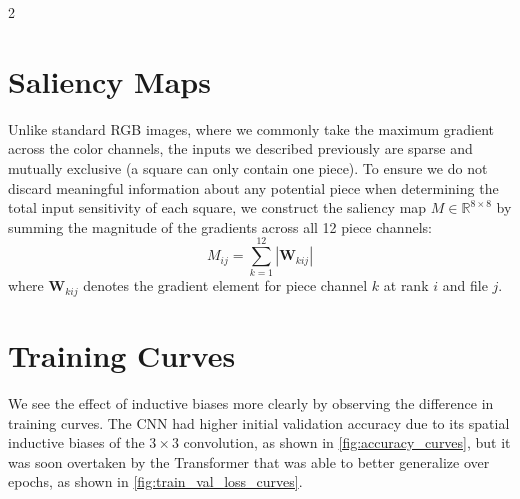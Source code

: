 \documentclass[a4paper,10pt]{article}
\begin{document}
\begin{multicols*}{2}
\section{Saliency Maps}
\label{sec:saliency_maps}
Unlike standard RGB images, where we commonly take the maximum gradient across the color channels, the inputs we described previously are sparse and mutually exclusive (a square can only contain one piece). To ensure we do not discard meaningful information about any potential piece when determining the total input sensitivity of each square, we construct the saliency map $M \in \mathbb{R}^{8 \times 8}$ by summing the magnitude of the gradients across all 12 piece channels:
\[M_{ij} = \sum_{k=1}^{12} | \mathbf{W}_{kij} |\]
where $\mathbf{W}_{kij}$ denotes the gradient element for piece channel $k$ at rank $i$ and file $j$.

\section{Training Curves}
\label{sec:training_curves}
We see the effect of inductive biases more clearly by observing the difference in training curves. The CNN had higher initial validation accuracy due to its spatial inductive biases of the $3 \times 3$ convolution, as shown in \autoref{fig:accuracy_curves}, but it was soon overtaken by the Transformer that was able to better generalize over epochs, as shown in \autoref{fig:train_val_loss_curves}.

\begin{figure}[H]
\centering
\begin{subfigure}{0.49\linewidth}
    \centering
\end{subfigure}
\end{figure}
\end{multicols*}
\end{document}
